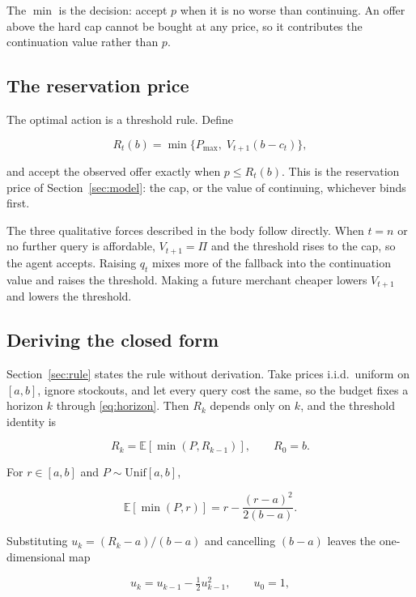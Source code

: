 The $\min$ is the decision: accept $p$ when it is no worse than continuing. An offer
above the hard cap cannot be bought at any price, so it contributes the continuation
value rather than $p$.

\subsection{The reservation price}

The optimal action is a threshold rule. Define

\begin{equation}
  R_t(b) = \min\{P_{\max},\; V_{t+1}(b - c_t)\},
\end{equation}

and accept the observed offer exactly when $p \le R_t(b)$. This is the reservation
price of Section~\ref{sec:model}: the cap, or the value of continuing, whichever
binds first.

The three qualitative forces described in the body follow directly. When $t = n$ or
no further query is affordable, $V_{t+1} = \Pi$ and the threshold rises to the cap,
so the agent accepts. Raising $q_t$ mixes more of the fallback into the continuation
value and raises the threshold. Making a future merchant cheaper lowers $V_{t+1}$ and
lowers the threshold.

\subsection{Deriving the closed form}

Section~\ref{sec:rule} states the rule without derivation. Take prices i.i.d.\
uniform on $[a, b]$, ignore stockouts, and let every query cost the same, so the
budget fixes a horizon $k$ through \eqref{eq:horizon}. Then $R_k$ depends only on
$k$, and the threshold identity is

\begin{equation}
  R_k = \mathbb{E}\!\left[\min(P, R_{k-1})\right],
  \qquad R_0 = b .
\end{equation}

For $r \in [a,b]$ and $P \sim \mathrm{Unif}[a,b]$,

\begin{equation}
  \mathbb{E}[\min(P, r)]
  = r - \frac{(r-a)^2}{2(b-a)} .
\end{equation}

Substituting $u_k = (R_k - a)/(b-a)$ and cancelling $(b-a)$ leaves the
one-dimensional map

\begin{equation}
  u_k = u_{k-1} - \tfrac{1}{2} u_{k-1}^2, \qquad u_0 = 1,
\end{equation}

